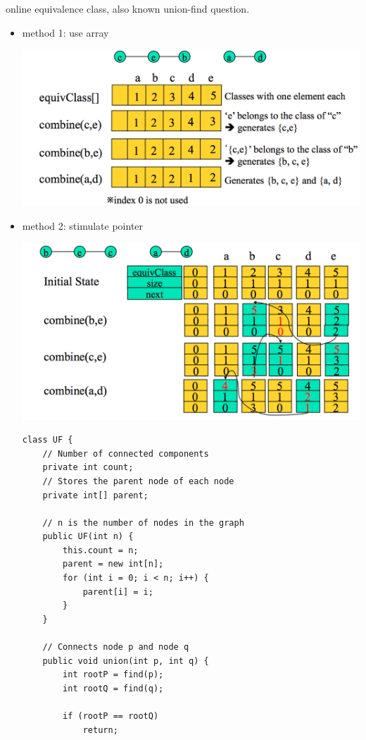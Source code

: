 \documentclass[a4paper,11pt,twoside]{book}
\begin{document}
	\par online equivalence class, also known union-find question.  
	\begin{itemize}
		\item method 1: use array  
\begin{center}
	\includegraphics[scale=0.55]{pics/online_1.png} 
\end{center}
		
		
		\item method 2: stimulate pointer
\begin{center}
	\includegraphics[scale=0.55]{pics/online_2.png}  
\end{center}

\begin{lstlisting}
class UF { 
	// Number of connected components
	private int count;
	// Stores the parent node of each node
	private int[] parent;
	
	// n is the number of nodes in the graph
	public UF(int n) {
		this.count = n;
		parent = new int[n];
		for (int i = 0; i < n; i++) {
			parent[i] = i;
		}
	}
	
	// Connects node p and node q
	public void union(int p, int q) {
		int rootP = find(p);
		int rootQ = find(q);
		
		if (rootP == rootQ)
			return;
		

\end{lstlisting}
\end{itemize}
\end{document}
